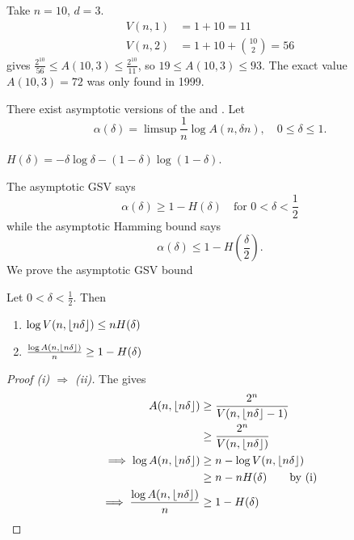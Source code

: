 \documentclass{article}
\DeclarePairedDelimiter{\floor}{\lfloor}{\rfloor}
\newcommand{\1}[1]{\mathbbm{1}_{#1}}
\begin{document}
\begin{eg}
    Take $n=10$, $d=3$.
    \begin{align*}
        V(n, 1) &= 1 + 10 = 11 \\
        V(n, 2) &= 1 + 10 + \binom{10}{2} = 56
    \end{align*}
     gives $\frac{2^{10}}{56} \leq A(10, 3) \leq \frac{2^{10}}{11}$, so $19 \leq A(10, 3) \leq 93$. The exact value $A(10, 3) = 72$ was only found in 1999.
\end{eg}
There exist asymptotic versions of the  and .
Let
\begin{equation*}\alpha(\delta) = \limsup \frac{1}{n} \log A(n, \delta n), \quad 0 \leq \delta \leq 1.\end{equation*}
\begin{notation}
    $H(\delta) = -\delta \log \delta - (1-\delta) \log (1-\delta)$.
\end{notation}
The asymptotic GSV says
\begin{equation*}
    \alpha(\delta) \geq 1 - H(\delta) \quad \text{for } 0 <\delta < \frac{1}{2}
\end{equation*}
while the asymptotic Hamming bound says
\begin{equation*}
    \alpha(\delta) \leq 1 - H\left(\frac{\delta}{2}\right).
\end{equation*}
We prove the asymptotic GSV bound
\begin{nprop}\label{prop:2.7}
    Let $0 < \delta < \frac{1}{2}$. Then
    \begin{enumerate}[label=(\roman*)]
        \item $\log V(n, \floor{n \delta}) \leq n H(\delta)$
        \item $\frac{\log A(n, \floor{n \delta})}{n} \geq 1 - H(\delta)$
    \end{enumerate}
\end{nprop}
\begin{proof}[Proof (i) $\Rightarrow$ (ii)]
    The  gives
    \begin{align*}
        A(n, \floor{n \delta}) &\geq \frac{2^n}{V(n, \floor{n \delta} - 1)} \\
                               &\geq \frac{2^n}{V(n, \floor{n \delta})} \\
        \implies \log A(n, \floor{n \delta}) &\geq n - \log V(n, \floor{n \delta})\\
                                             &\geq n - n H(\delta) \qquad \text{by (i)} \\
        \implies \frac{\log A(n, \floor{n\delta})}{n} &\geq 1 - H(\delta) \qedhere
    \end{align*}
\end{proof}
\end{document}
